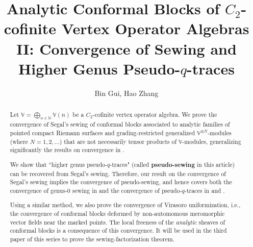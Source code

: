 \documentclass[11pt,b5paper,notitlepage]{article}
\title{Analytic Conformal Blocks of $C_2$-cofinite Vertex Operator Algebras II: Convergence of Sewing and Higher Genus Pseudo-$q$-traces}
\author{{\sc Bin Gui, Hao Zhang}
}
\date{}
\theoremstyle{definition}
\theoremstyle{plain}
\newcommand{\Vbb}{\mathbb V}
\newcommand{\Nbb}{\mathbb N}
\newcommand{\<}{\left\langle}
\renewcommand{\>}{\right\rangle}
\numberwithin{equation}{subsection}
\begin{document}
\sloppy %
	\setcounter{section}{-1}
	
	
	
	\maketitle
	
	
\newcommand\blfootnote[1]{%
	\begingroup
	\renewcommand\thefootnote{}\footnote{#1}%
	\addtocounter{footnote}{-1}%
	\endgroup
}



\begin{abstract}
Let $\Vbb=\bigoplus_{n\in\Nbb}\Vbb(n)$ be a $C_2$-cofinite vertex operator algebra. We prove the convergence of Segal's sewing of conformal blocks associated to analytic families of pointed compact Riemann surfaces and grading-restricted generalized $\Vbb^{\otimes N}$-modules (where $N=1,2,\dots$) that are not necessarily tensor products of $\Vbb$-modules, generalizing significantly the results on convergence in \cite{Gui-sewingconvergence}.

We show that ``higher genus pseudo-$q$-traces" (called \textbf{pseudo-sewing} in this article) can be recovered from Segal's sewing. Therefore, our result on the convergence of Segal's sewing implies the convergence of pseudo-sewing, and hence covers both the convergence of genus-$0$ sewing in \cite{HLZ7} and the convergence of pseudo-$q$-traces in \cite{Miy-modular-invariance} and \cite{Fio-genus-1}. 



Using a similar method, we also prove the convergence of Virasoro uniformization, i.e., the convergence of conformal blocks deformed by non-automomous meromorphic vector fields near the marked points. The local freeness of the \textit{analytic} sheaves of conformal blocks is a consequence of this convergence. It will be used in the third paper of this series to prove the sewing-factorization theorem.
\end{abstract}

 


\tableofcontents

\end{document}
